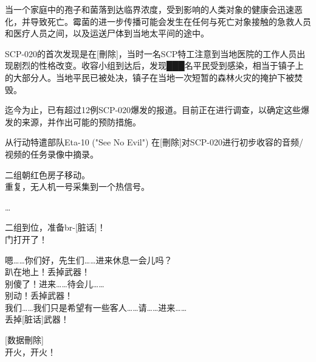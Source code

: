当一个家庭中的孢子和菌落到达临界浓度，受到影响的人类对象的健康会迅速恶化，并导致死亡。霉菌的进一步传播可能会发生在任何与死亡对象接触的急救人员和医疗人员之间，以及运送尸体到当地太平间的途中。

SCP-020的首次发现是在[刪除]，当时一名SCP特工注意到当地医院的工作人员出现剧烈的性格改变。收容小组到达后，发现███名平民受到感染，相当于镇子上的大部分人。当地平民已被处决，镇子在当地一次短暂的森林火灾的掩护下被焚毁。

迄今为止，已有超过12例SCP-020爆发的报道。目前正在进行调查，以确定这些爆发的来源，并作出可能的预防措施。

 从行动特遣部队Eta-10 ("See No Evil") 在[刪除]对SCP-020进行初步收容的音频\slash 视频的任务录像中摘录。

\begin{scpbox}

 二组朝红色房子移动。\\ 重复，无人机一号采集到一个热信号。

…

 二组到位，准备br-[脏话]！\\ 门打开了！


 嗯……你们好，先生们……进来休息一会儿吗？\\ 趴在地上！丢掉武器！\\ 别傻了！进来……待会儿……\\ 别动！丢掉武器！\\ 我们……我们只是希望有一些客人……请……进来……\\ 丢掉[脏话]武器！


 [数据刪除]\\ 开火，开火！


\end{scpbox}

